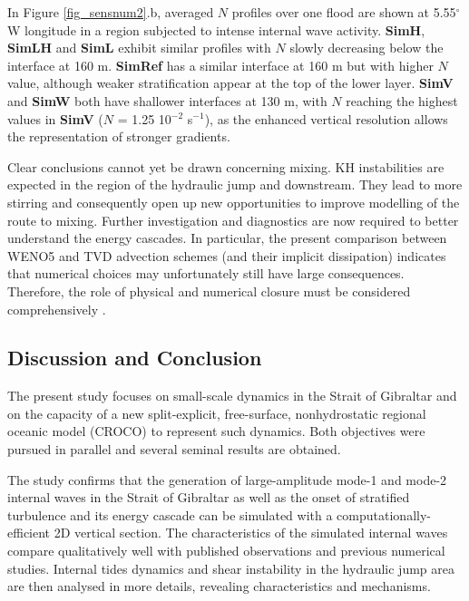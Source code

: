 In Figure \ref{fig_sensnum2}.b, averaged $N$ profiles over one flood  are shown at 5.55$^\circ$W longitude in a region subjected to intense internal wave activity. \textbf{SimH}, \textbf{SimLH} and \textbf{SimL} exhibit similar profiles with $N$ slowly decreasing below the interface at 160 m. \textbf{SimRef} has a similar interface at 160 m but with higher $N$ value, although weaker stratification appear at the top of the lower layer. \textbf{SimV} and \textbf{SimW} both have shallower interfaces at 130 m, with $N$ reaching the highest values in \textbf{SimV} ($N$ = 1.25 10$^{-2}$ s$^{-1}$), as the enhanced vertical resolution allows the representation of stronger gradients.

Clear conclusions cannot yet be drawn concerning mixing. KH instabilities are expected in the region of the hydraulic jump and downstream. They lead to more stirring and consequently open up new opportunities to improve modelling of the route to mixing. Further investigation and diagnostics are now required to better understand the energy cascades. In particular, the present comparison between WENO5 and TVD advection schemes (and their implicit dissipation) indicates that numerical choices may unfortunately still have large consequences. Therefore, the role of physical and numerical closure must be considered comprehensively \citep{Marchesiello2011, Soufflet2016}.

\subsection{Discussion and Conclusion}

The present study focuses on small-scale dynamics in the Strait of Gibraltar and on the capacity of a new split-explicit, free-surface, nonhydrostatic regional oceanic model (CROCO) to represent such dynamics. Both objectives were pursued in parallel and several seminal results are obtained.

The study confirms that the generation of large-amplitude mode-1 and mode-2 internal waves in the Strait of Gibraltar as well as the onset of stratified turbulence and its energy cascade can be simulated with a computationally-efficient 2D vertical section. The characteristics of the simulated internal waves compare qualitatively well with published observations and previous numerical studies. Internal tides dynamics and shear instability in the hydraulic jump area are then analysed in more details, revealing characteristics and mechanisms.
 
